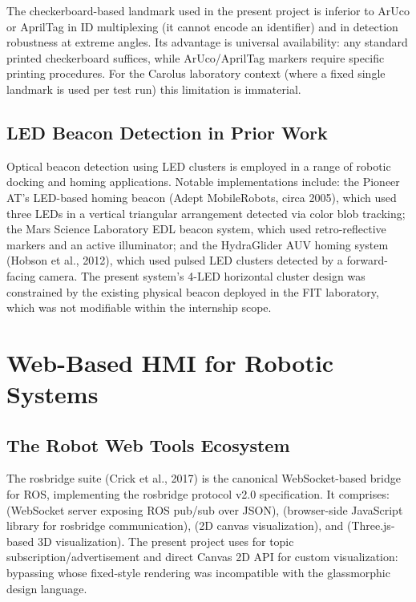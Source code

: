 The checkerboard-based landmark used in the present project is inferior to ArUco or AprilTag in ID multiplexing (it cannot encode an identifier) and in detection robustness at extreme angles. Its advantage is universal availability: any standard printed checkerboard suffices, while ArUco/AprilTag markers require specific printing procedures. For the Carolus laboratory context (where a fixed single landmark is used per test run) this limitation is immaterial.

\subsection{LED Beacon Detection in Prior Work}

Optical beacon detection using LED clusters is employed in a range of robotic docking and homing applications. Notable implementations include: the Pioneer AT's LED-based homing beacon (Adept MobileRobots, circa 2005), which used three LEDs in a vertical triangular arrangement detected via color blob tracking; the Mars Science Laboratory EDL beacon system, which used retro-reflective markers and an active illuminator; and the HydraGlider AUV homing system (Hobson et al., 2012), which used pulsed LED clusters detected by a forward-facing camera. The present system's 4-LED horizontal cluster design was constrained by the existing physical beacon deployed in the FIT laboratory, which was not modifiable within the internship scope.

\section{Web-Based HMI for Robotic Systems}

\subsection{The Robot Web Tools Ecosystem}

\label{sec:webrendering}
The rosbridge suite (Crick et al., 2017) is the canonical WebSocket-based bridge for ROS, implementing the rosbridge protocol v2.0 specification. It comprises:  (WebSocket server exposing ROS pub/sub over JSON),  (browser-side JavaScript library for rosbridge communication),  (2D canvas visualization), and  (Three.js-based 3D visualization). The present project uses  for topic subscription/advertisement and direct Canvas 2D API for custom visualization: bypassing  whose fixed-style rendering was incompatible with the glassmorphic design language.

